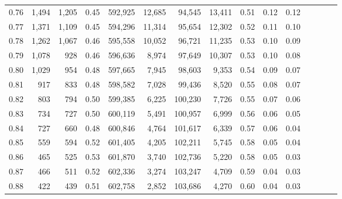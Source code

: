 \begin{tabular}{rrrcrrrrrrrrrrr}
0.76 &   1,494 &  1,205 &                                       0.45 &  592,925 &   12,685 &   94,545 &   13,411 &  0.51 &  0.12 &                         0.12 \\
0.77 &   1,371 &  1,109 &                                       0.45 &  594,296 &   11,314 &   95,654 &   12,302 &  0.52 &  0.11 &                         0.10 \\
0.78 &   1,262 &  1,067 &                                       0.46 &  595,558 &   10,052 &   96,721 &   11,235 &  0.53 &  0.10 &                         0.09 \\
0.79 &   1,078 &    928 &                                       0.46 &  596,636 &    8,974 &   97,649 &   10,307 &  0.53 &  0.10 &                         0.08 \\
0.80 &   1,029 &    954 &                                       0.48 &  597,665 &    7,945 &   98,603 &    9,353 &  0.54 &  0.09 &                         0.07 \\
0.81 &     917 &    833 &                                       0.48 &  598,582 &    7,028 &   99,436 &    8,520 &  0.55 &  0.08 &                         0.07 \\
0.82 &     803 &    794 &                                       0.50 &  599,385 &    6,225 &  100,230 &    7,726 &  0.55 &  0.07 &                         0.06 \\
0.83 &     734 &    727 &                                       0.50 &  600,119 &    5,491 &  100,957 &    6,999 &  0.56 &  0.06 &                         0.05 \\
0.84 &     727 &    660 &                                       0.48 &  600,846 &    4,764 &  101,617 &    6,339 &  0.57 &  0.06 &                         0.04 \\
0.85 &     559 &    594 &                                       0.52 &  601,405 &    4,205 &  102,211 &    5,745 &  0.58 &  0.05 &                         0.04 \\
0.86 &     465 &    525 &                                       0.53 &  601,870 &    3,740 &  102,736 &    5,220 &  0.58 &  0.05 &                         0.03 \\
0.87 &     466 &    511 &                                       0.52 &  602,336 &    3,274 &  103,247 &    4,709 &  0.59 &  0.04 &                         0.03 \\
0.88 &     422 &    439 &                                       0.51 &  602,758 &    2,852 &  103,686 &    4,270 &  0.60 &  0.04 &                         0.03 \\

\end{tabular}
